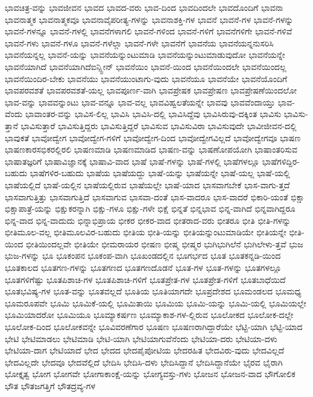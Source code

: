 {ಭಾವಚಿತ್ರ-ವನ್ನು
ಭಾವಜೀವನ
ಭಾವದ
ಭಾವದ-ವರು
ಭಾವ-ದಿಂದ
ಭಾವದಿಂದಲೇ
ಭಾವದೊಂದಿಗೆ
ಭಾವನಾ
ಭಾವನಾತ್ಮಕ
ಭಾವನಾತ್ಮಕವೂ
ಭಾವನಾವೈಪರೀತ್ಯ-ಗಳನ್ನು
ಭಾವನಾಶಕ್ತಿ-ಗಳ
ಭಾವನೆ
ಭಾವನೆ-ಗಳ
ಭಾವನೆ-ಗಳನ್ನು
ಭಾವನೆ-ಗಳನ್ನೂ
ಭಾವನೆ-ಗಳಲ್ಲಿ
ಭಾವನೆಗಳಾಗಲಿ
ಭಾವನೆ-ಗಳಿಂದ
ಭಾವನೆ-ಗಳಿಗೆ
ಭಾವನೆಗಳಿಗೇ
ಭಾವನೆ-ಗಳಿವೆ
ಭಾವನೆ-ಗಳು
ಭಾವನೆ-ಗಳೂ
ಭಾವನೆ-ಗಳೆಲ್ಲಾ
ಭಾವನೆ-ಗಳೇ
ಭಾವನೆಗೆ
ಭಾವನೆಯ
ಭಾವನೆಯನ್ನನುಸರಿಸಿ
ಭಾವನೆಯನ್ನಲ್ಲ
ಭಾವನೆ-ಯನ್ನು
ಭಾವನೆಯನ್ನುಂಟುಮಾಡಿ
ಭಾವನೆಯನ್ನುಂಟುಮಾಡುವುದೋ
ಭಾವನೆಯನ್ನೇ
ಭಾವನೆಯಾಗಿದೆ
ಭಾವನೆಯಾಗಿದೆಐನ್ಸ್ಟೀನ್
ಭಾವನೆಯಿಂ
ಭಾವನೆ-ಯಿಂದ
ಭಾವನೆಯಿಂದಲೇ
ಭಾವನೆಯಿಂದಲ್ಲ
ಭಾವನೆಯಿಂದಿರ-ಬೇಕು
ಭಾವನೆಯು
ಭಾವನೆಯುಂಟಾಗು-ವುದು
ಭಾವನೆಯೂ
ಭಾವನೆಯೇ
ಭಾವನೆಯೊಂದಿಗೆ
ಭಾವಪರವಶತೆ
ಭಾವಪರವಶತೆ-ಯಲ್ಲ
ಭಾವಪೂರ್ಣ-ವಾಗಿ
ಭಾವಪ್ರೇಷಕ
ಭಾವಪ್ರೇಷಣ
ಭಾವಪ್ರೇಷಣೆಯಿಂದಲೋ
ಭಾವ-ವನ್ನು
ಭಾವವನ್ನುಂಟು
ಭಾವ-ವನ್ನೂ
ಭಾವ-ವಲ್ಲ
ಭಾವವಿಹ್ವಲತೆಯನ್ನೇ
ಭಾವವು
ಭಾವವೆಂದಾಯ್ತು
ಭಾವ-ವೆಂದು
ಭಾವಾಂತರ-ವನ್ನು
ಭಾವಿಸ-ಲಿಲ್ಲ
ಭಾವಿಸಿ
ಭಾವಿಸಿ-ದಲ್ಲಿ
ಭಾವಿಸಿದ್ದೆವು
ಭಾವಿಸಿರುವು-ದಕ್ಕಿಂತ
ಭಾವಿಸು
ಭಾವಿಸು-ತ್ತಾನೆ
ಭಾವಿಸುತ್ತಾರೆ
ಭಾವಿಸುತ್ತಿದ್ದರು
ಭಾವಿಸುತ್ತಿದ್ದರೆ
ಭಾವಿಸುವ
ಭಾವಿಸುವಿರಾ
ಭಾವಿಸುವುದೇ
ಭಾವೀಜೀವನ-ದಲ್ಲಿ
ಭಾವುಕತೆ
ಭಾವೋದ್ವೇಗ
ಭಾವೋದ್ವೇಗ-ಗಳಿಗೆ
ಭಾವೋದ್ವೇಗ-ದಿಂದ
ಭಾವೋದ್ವೇಗವಿಲ್ಲದೆ
ಭಾವೋದ್ವೇಗವೂ
ಭಾಷಣ
ಭಾಷಣಕಾರಸಭಿಕರಲ್ಲಿರಲಿ
ಭಾಷಣಮಾಡಿ
ಭಾಷಣಮಾಡಿದ
ಭಾಷಣ-ವನ್ನು
ಭಾಷಣೋಪಯೋಗಿ
ಭಾಷಾಂತರಿಸುವ
ಭಾಷಾತಜ್ಞರಿಗೆ
ಭಾಷಾವಿಜ್ಞಾನಕ್ಕೆ
ಭಾಷಾವಿ-ವಾದ
ಭಾಷೆ
ಭಾಷೆ-ಗಳನ್ನು
ಭಾಷೆ-ಗಳಲ್ಲಿ
ಭಾಷೆಗಳಲ್ಲೂ
ಭಾಷೆಗಳಿದ್ದಿರ-ಬಹುದು
ಭಾಷೆಗಳಿರ-ಬಹುದು
ಭಾಷೆಯ
ಭಾಷೆಯದ್ದು
ಭಾಷೆ-ಯನ್ನು
ಭಾಷೆಯನ್ನೇ
ಭಾಷೆ-ಯಲ್ಲ
ಭಾಷೆ-ಯಲ್ಲಿ
ಭಾಷೆಯಲ್ಲಿದೆ
ಭಾಷೆ-ಯಲ್ಲಿನ
ಭಾಷೆಯಲ್ಲಿರುವ
ಭಾಷೆಯಲ್ಲೇ
ಭಾಷೆ-ಯಾದ
ಭಾಸವಾಗಬೇಕೆ
ಭಾಸ-ವಾಗು-ತ್ತದೆ
ಭಾಸವಾಗುತ್ತಿತ್ತು
ಭಾಸವಾಗುತ್ತಿದೆ
ಭಾಸವಾಗುವ
ಭಾಸವಾ-ದಂತೆ
ಭಾಸ-ವಾದರೂ
ಭಾಸ-ವಾದರೆ
ಭಿಕಾರಿ-ಯಂತೆ
ಭಿಕ್ಷಾ
ಭಿಕ್ಷಾಪಾತ್ರೆ-ಯನ್ನು
ಭಿಕ್ಷುಕರನ್ನಾಗಿ
ಭಿಕ್ಷು-ಗಳೂ
ಭಿಕ್ಷು-ಗಳೇ
ಭಿಕ್ಷೆ
ಭಿನ್ನತೆ
ಭಿನ್ನಭಾವ
ಭಿನ್ನ-ವಾಗಿದೆ
ಭಿನ್ನವಾಗಿದ್ದರೂ
ಭಿನ್ನ-ವಾದ
ಭಿನ್ನ-ವಾದುದು
ಭಿನ್ನಾಭಿಪ್ರಾಯ
ಭೀಕರ
ಭೀಕರ-ವಾದ
ಭೀತರಾದ-ವರು
ಭೀತರೂ
ಭೀತಿ
ಭೀತಿ-ಗಳನ್ನು
ಭೀತಿಮೂಲ-ವಲ್ಲ
ಭೀತಿಮೂಲವಿರ-ಬಹುದು
ಭೀತಿಯ
ಭೀತಿ-ಯನ್ನು
ಭೀತಿಯನ್ನುಂಟುಮಾಡಿಯೇ
ಭೀತಿಯನ್ನೇ
ಭೀತಿ-ಯಿಂದ
ಭೀತಿಯಿಂದಲ್ಲವೇ
ಭೀತಿಯೇ
ಭೀಮರಾಯರ
ಭೀಷಣ
ಭೀಷ್ಮ
ಭೀಷ್ಮರ
ಭುಗಿಭುಗಿಲೆನೆ
ಭುಗಿಲೇಳು-ತ್ತವೆ
ಭುಜ
ಭುಜ-ಗಳನ್ನು
ಭೂ
ಭೂಕಂಪನ
ಭೂಕಂಪ-ವಾಗಿ
ಭೂಖಂಡದಲ್ಲಿನ
ಭೂಗರ್ಭದ
ಭೂತ
ಭೂತಕನ್ನಡಿ-ಯಿಂದ
ಭೂತಕಾಲದ
ಭೂತಗಣ-ಗಳನ್ನು
ಭೂತಗಣದ
ಭೂತಗಣದೊಡನೆ
ಭೂತ-ಗಳ
ಭೂತ-ಗಳನ್ನು
ಭೂತಗಳಲ್ಲೂ
ಭೂತಗಳಿಗೆಷ್ಟು
ಭೂತಪಿಶಾಚಿ-ಗಳ
ಭೂತಪಿಶಾಚಿ-ಗಳಿಗೆ
ಭೂತಪ್ರೇತ-ಗಳ
ಭೂತಪ್ರೇತ-ಗಳಿಗೆ
ಭೂತಬಾಧೆಯಿದೆ
ಭೂತಭವಿಷ್ಯ-ಗಳ
ಭೂತ-ವನ್ನು
ಭೂತವಲ್ಲದೆ
ಭೂತಿಯ
ಭೂತಿಯಾಗದೇ
ಭೂಪ್ರದೇಶದ
ಭೂಮಂಡಲದ
ಭೂಮಧ್ಯ
ಭೂಮರೂಪವೇ
ಭೂಮಿ
ಭೂಮಿಕೆ-ಯಲ್ಲಿ
ಭೂಮಿತಾಯಿ
ಭೂಮಿಯ
ಭೂಮಿ-ಯನ್ನು
ಭೂಮಿ-ಯಲ್ಲಿ
ಭೂಮಿಯಲ್ಲೇ
ಭೂಮಿಯಾದರೋ
ಭೂಮಿಯೂ
ಭೂಮ್ಯಾಕರ್ಷಣ
ಭೂಮ್ಯಾಕಾಶ-ಗಳ-ಲ್ಲಿರುವ
ಭೂಲೋಕದ
ಭೂಲೋಕ-ದಲ್ಲೇ
ಭೂಲೋಕ-ದಿಂದ
ಭೂಲೋಕವನ್ನೇ
ಭೂವಿವರಣೆಗಾರ
ಭೂಷಣ
ಭೂಷಣರಾಗಿದ್ದಾರೆಯೇ
ಭೆಟ್ಟಿ-ಯಾಗಿ
ಭೆಟ್ಟಿ-ಯಾದ
ಭೇಟಿ
ಭೇಟಿಮಾಡಲು
ಭೇಟಿಮಾಡಿ
ಭೇಟಿ-ಯಾಗಿ
ಭೇಟಿಯಾಗುವೆನೆಂದು
ಭೇಟಿಯಾ-ದರು
ಭೇಟಿಯಾ-ದಳು
ಭೇಟಿಯಾ-ದಾಗ
ಭೇಟಿಯಾದೆ
ಭೇದ
ಭೇದದ
ಭೇದಪೈಪೋಟಿಯ
ಭೇದರಹಿತ
ಭೇದವಿರು-ವುದು
ಭೇದವಿಲ್ಲದೆ
ಭೇದವಿಲ್ಲದೇ
ಭೇದವೂ
ಭೇದವೆಲ್ಲಿದೆ
ಭೇದಿಸಿ
ಭೇದಿಸಿ-ದಳು
ಭೇದಿಸಿದ್ದಾನೆ
ಭೇದಿಸಿದ್ದಾನೆಯೇ
ಭೈರವ
ಭೈರಾಗಿ
ಭೋಕ್ತೃತ್ವ
ಭೋಗ
ಭೋಗವೇ
ಭೋಗಾಕಾಂಕ್ಷೆ-ಯನ್ನು
ಭೋಗ್ಯವಸ್ತು-ಗಳು
ಭೋಜನ
ಭೋಜನ-ವಾದ
ಭೌಗೋಲಿಕ
ಭೌತ
ಭೌತಜಗತ್ತಿಗೆ
ಭೌತದ್ರವ್ಯ-ಗಳ
}
